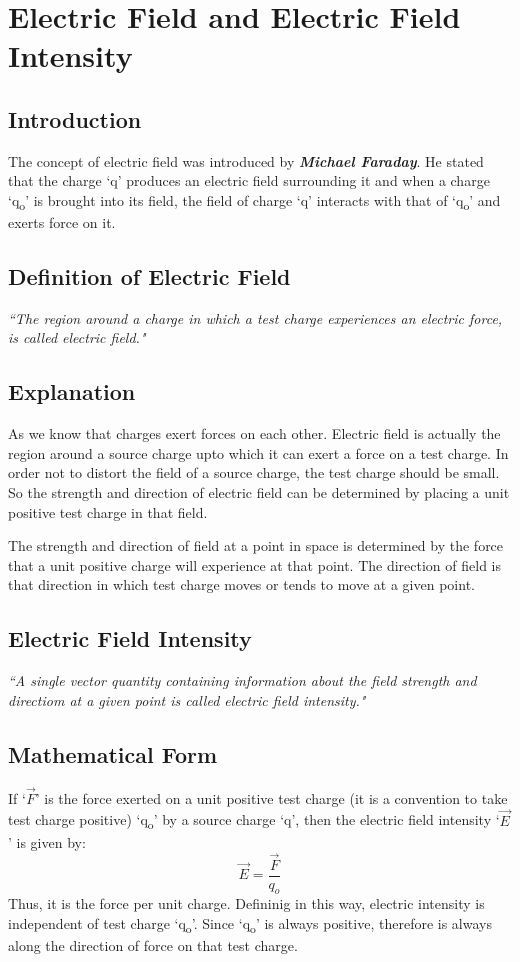 \section{Electric Field and Electric Field Intensity}
\subsection*{Introduction}
The concept of electric field was introduced by \textbf{\textit{Michael Faraday}}.
He stated that the charge `q' produces an electric field surrounding it
and when a charge `q\textsubscript{o}' is brought into its field,
the field of charge `q' interacts with that of `q\textsubscript{o}' and exerts force on it.
\subsection*{Definition of Electric Field}
\textit{``The region around a charge in which a test charge
experiences an electric force, is called electric field."}
\subsection*{Explanation}
As we know that charges exert forces on each other.
Electric field is actually the region around a source charge upto
which it can exert a force on a test charge.
In order not to distort the field of a source charge,
the test charge should be small.
So the strength and direction of electric field can be determined
by placing a unit positive test charge in that field.

The strength and direction of field at a point in space is
determined by the force that a unit positive charge will
experience at that point. The direction of field is that direction
in which test charge moves or tends to move at a given point.
\subsection*{Electric Field Intensity}
\textit{``A single vector quantity containing information about the field strength and
directiom at a given point is called electric field intensity."}
\subsection*{Mathematical Form}
If `$\vec{F}$' is the force exerted on a unit positive test charge (it is a
convention to take test charge positive) `q\textsubscript{o}' by a source charge `q',
then the electric field intensity `$\vec{E}$' is given by:
\begin{equation}\label{eq:11.13}
  \vec{E} = \frac{\vec{F}}{q_{o}}
\end{equation}
Thus, it is the force per unit charge.
Defininig in this way, electric intensity is independent of test charge `q\textsubscript{o}'.
Since `q\textsubscript{o}' is always positive, therefore is always along the direction of
force on that test charge.
